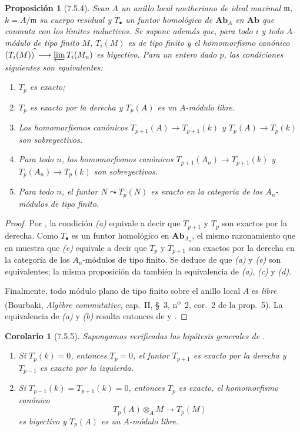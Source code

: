 \documentclass[10pt,oneside,openany]{book}
\theoremstyle{egaenv}\newtheorem*{env}{---}
\theoremstyle{egastatement}
\newtheorem*{proposition}{Proposición}
\newtheorem*{corollary}{Corolario}
\theoremstyle{egadescription}
\begin{document}
\begin{proposition}[7.5.4]
\label{III.7.5.4}
Sean $A$ un anillo local noetheriano de ideal maximal $\mathfrak m$,
$k=A/\mathfrak m$ su cuerpo residual y $T_\bullet$ un funtor
homológico de $\mathbf{Ab}_A$ en $\mathbf{Ab}$ que conmuta con los límites
inductivos. Se supone además que, para todo $i$ y todo $A$-módulo
de tipo finito $M$, $T_i(M)$ es de tipo finito y el homomorfismo
canónico
$(T_i(M))^{\widehat{\,}}\longrightarrow\varprojlim T_i(M_n)$
es biyectivo. Para un entero dado $p$, las condiciones siguientes
son equivalentes:
\begin{enumerate}
  \item[(a)] $T_p$ es exacto;
  \item[(b)] $T_p$ es exacto por la derecha y $T_p(A)$ es un
    $A$-módulo libre.
  \item[c)] Los homomorfismos canónicos
    $T_{p+1}(A)\longrightarrow T_{p+1}(k)$ y $T_p(A)\longrightarrow T_p(k)$
    son sobreyectivos.
  \item[d)] Para todo $n$, los homomorfismos canónicos
    $T_{p+1}(A_n)\longrightarrow T_{p+1}(k)$ y $T_p(A_n)\longrightarrow T_p(k)$
    son sobreyectivos.
  \item[e)] Para todo $n$, el funtor $N\leadsto T_p(N)$ es exacto
    en la categoría de los $A_n$-módulos de tipo finito.
\end{enumerate}
\end{proposition}

\begin{proof}
Por , la condición \emph{(a)} equivale a decir que
$T_{p+1}$ y $T_p$ son exactos por la derecha. Como $T_\bullet$ es
un funtor homológico en $\boldsymbol{Ab}_{A_n}$, el mismo razonamiento que
en  muestra que \emph{(e)} equivale a decir que $T_p$ y
$T_{p+1}$ son exactos por la derecha en la categoría de los
$A_n$-módulos de tipo finito. Se deduce de  que \emph{(a)}
y \emph{(e)} son equivalentes; la misma proposición da también la
equivalencia de \emph{(a)}, \emph{(c)} y \emph{(d)}.

Finalmente, todo módulo plano de tipo finito sobre el anillo local
$A$ es \emph{libre} (Bourbaki, \emph{Algèbre commutative}, cap.~II,
\S~3, n\textsuperscript{o}~2, cor.~2 de la prop.~5). La equivalencia
de \emph{(a)} y \emph{(b)} resulta entonces de  y
.
\end{proof}

\begin{corollary}[7.5.5]
\label{III.7.5.5}
Supongamos verificadas las hipótesis generales de
.
\begin{enumerate}
  \item[\textup{(i)}] Si $T_p(k)=0$, entonces $T_p=0$, el funtor $T_{p+1}$
    es exacto por la derecha y $T_{p-1}$ es exacto por la izquierda.
  \item[\textup{(ii)}] Si $T_{p-1}(k)=T_{p+1}(k)=0$, entonces $T_p$ es
    exacto, el homomorfismo canónico
    \[
      T_p(A)\otimes_A M\longrightarrow T_p(M)
    \]
    es biyectivo y $T_p(A)$ es un $A$-módulo libre.
\end{enumerate}
\end{corollary}
\end{document}
